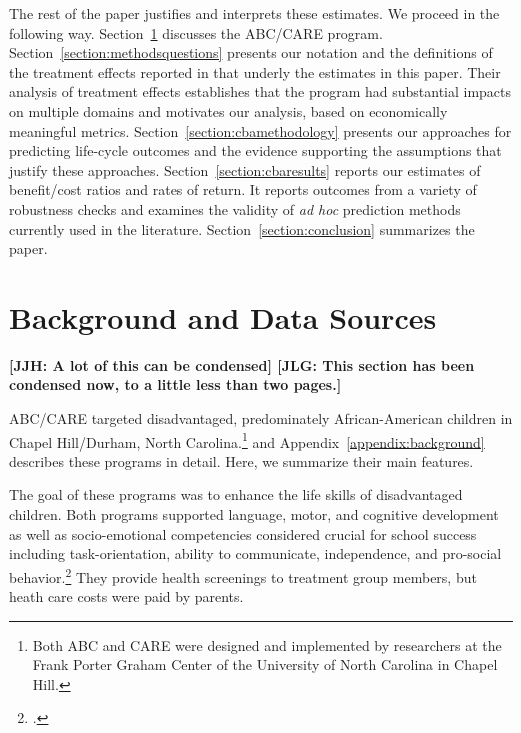 The rest of the paper justifies and interprets these estimates. We proceed in the following way. Section~\ref{section:background} discusses the ABC/CARE program. Section~\ref{section:methodsquestions} presents our notation and the definitions of the treatment effects reported in \cite{Garcia_Ziff_2017_Gender-Diff_UNPUBLISHED} that underly the estimates in this paper. Their analysis of treatment effects establishes that the program had substantial impacts on multiple domains and motivates our analysis, based on economically meaningful metrics. Section~\ref{section:cbamethodology} presents our approaches for predicting life-cycle outcomes and the evidence supporting the assumptions that justify these approaches. Section~\ref{section:cbaresults} reports our estimates of benefit/cost ratios and rates of return. It reports outcomes from a variety of robustness checks and examines the validity of \emph{ad hoc} prediction methods currently used in the literature. Section~\ref{section:conclusion} summarizes the paper.


\section[Background and Data Sources]{Background and Data Sources} \label{section:background}

\noindent \textbf{[JJH: A lot of this can be condensed] [JLG: This section has been condensed now, to a little less than two pages.]} 

ABC/CARE targeted disadvantaged, predominately African-American children in Chapel Hill/Durham, North Carolina.\footnote{Both ABC and CARE were designed and implemented by researchers at the Frank Porter Graham Center of the University of North Carolina in Chapel Hill.} \cite{Garcia_Ziff_2017_Gender-Diff_UNPUBLISHED} and  Appendix~\ref{appendix:background} describes these programs in detail. Here, we summarize their main features.

The goal of these programs was to enhance the life skills of disadvantaged children. Both programs supported language, motor, and cognitive development as well as socio-emotional competencies considered crucial for school success including task-orientation, ability to communicate, independence, and pro-social behavior.\footnote{\citet{Ramey_Collier_etal_1976_CarolinaAbecedarianProject, Ramey_etal_1985_Project-CARE_TiECSE, Sparling_1974_Synth_Edu_Infant_SPEECH, Wasik_Ramey_etal_1990_CD, Ramey-etal_2012-ABC}.} They provide health screenings to treatment group members, but heath care costs were paid by parents.

